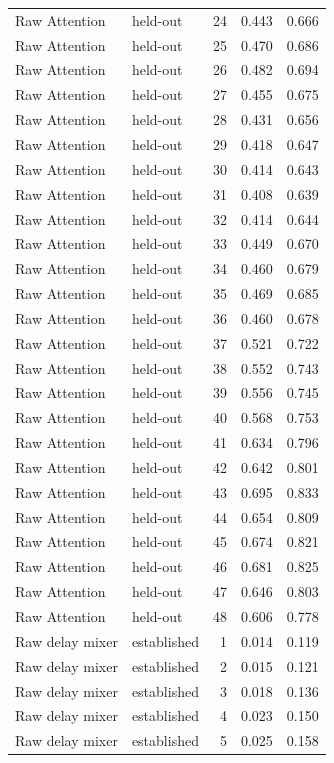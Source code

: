 \begin{tabular}{llrrr}
Raw Attention & held-out & 24 & 0.443 & 0.666 \\
Raw Attention & held-out & 25 & 0.470 & 0.686 \\
Raw Attention & held-out & 26 & 0.482 & 0.694 \\
Raw Attention & held-out & 27 & 0.455 & 0.675 \\
Raw Attention & held-out & 28 & 0.431 & 0.656 \\
Raw Attention & held-out & 29 & 0.418 & 0.647 \\
Raw Attention & held-out & 30 & 0.414 & 0.643 \\
Raw Attention & held-out & 31 & 0.408 & 0.639 \\
Raw Attention & held-out & 32 & 0.414 & 0.644 \\
Raw Attention & held-out & 33 & 0.449 & 0.670 \\
Raw Attention & held-out & 34 & 0.460 & 0.679 \\
Raw Attention & held-out & 35 & 0.469 & 0.685 \\
Raw Attention & held-out & 36 & 0.460 & 0.678 \\
Raw Attention & held-out & 37 & 0.521 & 0.722 \\
Raw Attention & held-out & 38 & 0.552 & 0.743 \\
Raw Attention & held-out & 39 & 0.556 & 0.745 \\
Raw Attention & held-out & 40 & 0.568 & 0.753 \\
Raw Attention & held-out & 41 & 0.634 & 0.796 \\
Raw Attention & held-out & 42 & 0.642 & 0.801 \\
Raw Attention & held-out & 43 & 0.695 & 0.833 \\
Raw Attention & held-out & 44 & 0.654 & 0.809 \\
Raw Attention & held-out & 45 & 0.674 & 0.821 \\
Raw Attention & held-out & 46 & 0.681 & 0.825 \\
Raw Attention & held-out & 47 & 0.646 & 0.803 \\
Raw Attention & held-out & 48 & 0.606 & 0.778 \\
Raw delay mixer & established & 1 & 0.014 & 0.119 \\
Raw delay mixer & established & 2 & 0.015 & 0.121 \\
Raw delay mixer & established & 3 & 0.018 & 0.136 \\
Raw delay mixer & established & 4 & 0.023 & 0.150 \\
Raw delay mixer & established & 5 & 0.025 & 0.158 \\

\end{tabular}
